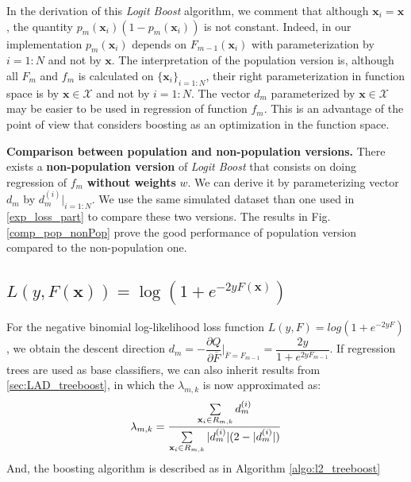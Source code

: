 \documentclass[a4paper,twoside,12pt]{article}
\begin{document}
In the derivation of this \textsl{Logit Boost} algorithm, we comment that although $\textbf{x}_i = \textbf{x}$, the quantity $p_m(\textbf{x}_i)(1 - p_m(\textbf{x}_i))$ is not constant. Indeed, in our implementation $p_m(\textbf{x}_i)$ depends on $F_{m-1}(\textbf{x}_i)$ with parameterization by $i=1:N$ and not by $\textbf{x}$. The interpretation of the population version is, although all $F_m$ and $f_m$ is calculated on $\{ \textbf{x}_i\}_{i=1:N}$, their right parameterization in function space is by $\textbf{x} \in \mathcal{X}$ and not by $i=1:N$. The vector $d_m$ parameterized by $\textbf{x} \in \mathcal{X}$ may be easier to be used in regression of function $f_m$. This is an advantage of the point of view that considers boosting as an optimization in the function space.

\textbf{Comparison between population and non-population versions.} There exists a \textbf{non-population version} of \textsl{Logit Boost} that consists on doing regression of $f_m$ \textbf{without weights} $w$. We can derive it by parameterizing vector $d_m$ by $d_m^{(i)}\vert_{i=1:N}$. We use the same simulated dataset than one used in \ref{exp_loss_part} to compare these two versions. The results in Fig. \ref{comp_pop_nonPop} prove the good performance of population version compared to the non-population one.

\subsection{$L(y, F(\textbf{x})) = \log(1+e^{-2yF(\textbf{x})})$}
For the negative binomial log-likelihood loss function $L(y, F) = log(1+e^{-2yF})$, we obtain the descent direction $d_m = -\dfrac{\partial{Q}}{\partial{\overline{F}}}\vert_{\overline{F} = F_{m-1}} = \dfrac{2y}{1+e^{2yF_{m-1}}}$. If regression trees are used as base classifiers, we can also inherit results from \ref{sec:LAD_treeboost}, in which the $\lambda_{m,k}$ is now approximated as:
\begin{align}
	\lambda_{m,k} = \frac{\sum\limits_{\textbf{x}_i\in{R_{m,k}}}d_{m}^{(i)}}{\sum\limits_{\textbf{x}_i\in{R_{m,k}}}|d_{m}^{(i)}|(2 - |d_{m}^{(i)}|)} \notag
\end{align}
And, the boosting algorithm is described as in Algorithm \ref{algo:l2_treeboost}
\end{document}
